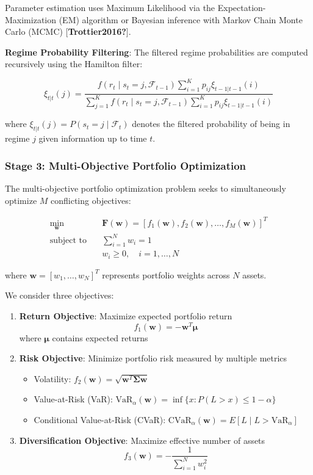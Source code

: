 \documentclass[
  10pt,
  a4paper,
]{article}
\providecommand{\tightlist}{%
  \setlength{\itemsep}{0pt}\setlength{\parskip}{0pt}}
\begin{document}
Parameter estimation uses Maximum Likelihood via the
Expectation-Maximization (EM) algorithm or Bayesian inference with
Markov Chain Monte Carlo (MCMC) {[}\textbf{Trottier2016?}{]}.

\textbf{Regime Probability Filtering}: The filtered regime probabilities
are computed recursively using the Hamilton filter:

\[
\xi_{t|t}(j) = \frac{f(r_t \mid s_t=j, \mathcal{F}_{t-1}) \sum_{i=1}^{K} p_{ij} \xi_{t-1|t-1}(i)}{\sum_{j=1}^{K} f(r_t \mid s_t=j, \mathcal{F}_{t-1}) \sum_{i=1}^{K} p_{ij} \xi_{t-1|t-1}(i)}
\]

where \(\xi_{t|t}(j) = P(s_t = j \mid \mathcal{F}_t)\) denotes the
filtered probability of being in regime \(j\) given information up to
time \(t\).

\subsubsection{Stage 3: Multi-Objective Portfolio
Optimization}\label{sec-moo}

The multi-objective portfolio optimization problem seeks to
simultaneously optimize \(M\) conflicting objectives:

\[
\begin{aligned}
\min_{\mathbf{w}} \quad & \mathbf{F}(\mathbf{w}) = [f_1(\mathbf{w}), f_2(\mathbf{w}), \ldots, f_M(\mathbf{w})]^T \\
\text{subject to} \quad & \sum_{i=1}^{N} w_i = 1 \\
& w_i \geq 0, \quad i = 1, \ldots, N
\end{aligned}
\]

where \(\mathbf{w} = [w_1, \ldots, w_N]^T\) represents portfolio weights
across \(N\) assets.

We consider three objectives:

\begin{enumerate}
\def\labelenumi{\arabic{enumi}.}
\item
  \textbf{Return Objective}: Maximize expected portfolio return
  \[f_1(\mathbf{w}) = -\mathbf{w}^T \boldsymbol{\mu}\] where
  \(\boldsymbol{\mu}\) contains expected returns
\item
  \textbf{Risk Objective}: Minimize portfolio risk measured by multiple
  metrics

  \begin{itemize}
  \tightlist
  \item
    Volatility:
    \(f_2(\mathbf{w}) = \sqrt{\mathbf{w}^T \boldsymbol{\Sigma} \mathbf{w}}\)
  \item
    Value-at-Risk (VaR):
    \(\text{VaR}_\alpha(\mathbf{w}) = \inf\{x : P(L > x) \leq 1-\alpha\}\)
  \item
    Conditional Value-at-Risk (CVaR):
    \(\text{CVaR}_\alpha(\mathbf{w}) = E[L \mid L > \text{VaR}_\alpha]\)
  \end{itemize}
\item
  \textbf{Diversification Objective}: Maximize effective number of
  assets \[f_3(\mathbf{w}) = -\frac{1}{\sum_{i=1}^{N} w_i^2}\]
\end{enumerate}
\end{document}
